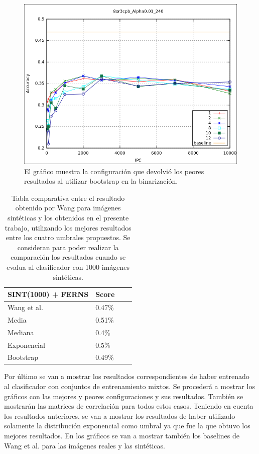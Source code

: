 			\begin{figure}[htbp]
				\centering
				\includegraphics[scale=0.6]{img/resultados/sinteticas/worst_bootstrap_8or3cpb_Alpha0,01_240.png}
				\caption[Sintéticas bootstrap peor resultado]{El gráfico muestra la configuración que devolvió los peores resultados al utilizar bootstrap en la binarización.}
				\label{fig: Sinteticas-bootstrap-bajo}
			\end{figure}


	\begin{table}
		\centering
		\begin{tabular}{ | l | l | l | p{5cm} |}
    			\hline
    				\textbf{SINT(1000) + FERNS} & \textbf{Score} \\ \hline
    				Wang et al. & 0.47\% \\ \hline
    				Media & 0.51\% \\ \hline
    				Mediana & 0.4\%\\ \hline
    				Exponencial & 0.5\% \\ \hline
    				Bootstrap & 0.49\%\\ 
    			\hline
    		\end{tabular}
    		\caption{Tabla comparativa entre el resultado obtenido por Wang para imágenes sintéticas y los obtenidos en el presente trabajo, utilizando los mejores resultados entre los cuatro umbrales propuestos. Se consideran para poder realizar la comparación los resultados cuando se evalua al clasificador con 1000 imágenes sintéticas.}
    	\end{table}
			
\newpage
	Por último se van a mostrar los resultados correspondientes de haber entrenado al clasificador con conjuntos de entrenamiento mixtos. Se procederá a mostrar los gráficos con las mejores y peores configuraciones y sus resultados. También se mostrarán las matrices de correlación para todos estos casos. Teniendo en cuenta los resultados anteriores, se van a mostrar los resultados de haber utilizado solamente la distribución exponencial como umbral ya que fue la que obtuvo los mejores resultados. En los gráficos  se van a mostrar también los baselines de Wang et al. para las imágenes reales y las sintéticas.
	
